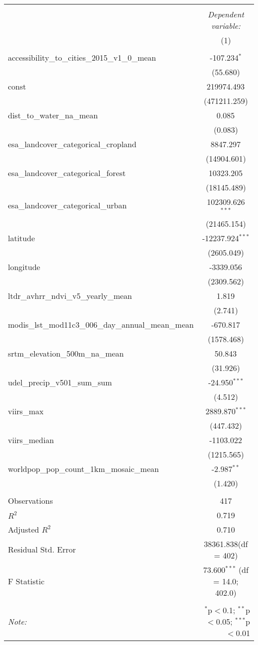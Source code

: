 \begin{table}[!htbp] \centering
\begin{tabular}{@{\extracolsep{5pt}}lc}
\\[-1.8ex]\hline
\hline \\[-1.8ex]
& \multicolumn{1}{c}{\textit{Dependent variable:}} \
\cr \cline{1-2}
\\[-1.8ex] & (1) \\
\hline \\[-1.8ex]
 accessibility_to_cities_2015_v1_0_mean & -107.234$^{*}$ \\
  & (55.680) \\
 const & 219974.493$^{}$ \\
  & (471211.259) \\
 dist_to_water_na_mean & 0.085$^{}$ \\
  & (0.083) \\
 esa_landcover_categorical_cropland & 8847.297$^{}$ \\
  & (14904.601) \\
 esa_landcover_categorical_forest & 10323.205$^{}$ \\
  & (18145.489) \\
 esa_landcover_categorical_urban & 102309.626$^{***}$ \\
  & (21465.154) \\
 latitude & -12237.924$^{***}$ \\
  & (2605.049) \\
 longitude & -3339.056$^{}$ \\
  & (2309.562) \\
 ltdr_avhrr_ndvi_v5_yearly_mean & 1.819$^{}$ \\
  & (2.741) \\
 modis_lst_mod11c3_006_day_annual_mean_mean & -670.817$^{}$ \\
  & (1578.468) \\
 srtm_elevation_500m_na_mean & 50.843$^{}$ \\
  & (31.926) \\
 udel_precip_v501_sum_sum & -24.950$^{***}$ \\
  & (4.512) \\
 viirs_max & 2889.870$^{***}$ \\
  & (447.432) \\
 viirs_median & -1103.022$^{}$ \\
  & (1215.565) \\
 worldpop_pop_count_1km_mosaic_mean & -2.987$^{**}$ \\
  & (1.420) \\
\hline \\[-1.8ex]
 Observations & 417 \\
 $R^2$ & 0.719 \\
 Adjusted $R^2$ & 0.710 \\
 Residual Std. Error & 38361.838(df = 402)  \\
 F Statistic & 73.600$^{***}$ (df = 14.0; 402.0) \\
\hline
\hline \\[-1.8ex]
\textit{Note:} & \multicolumn{1}{r}{$^{*}$p$<$0.1; $^{**}$p$<$0.05; $^{***}$p$<$0.01} \\
\end{tabular}
\end{table}
